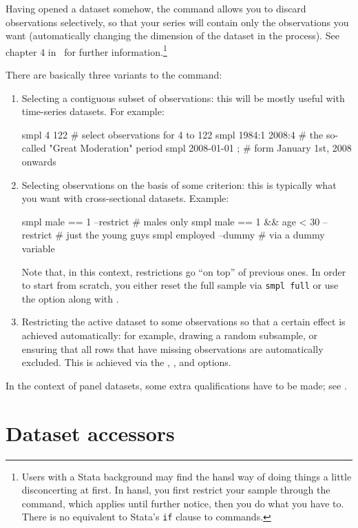 Having opened a dataset somehow, the  command allows you to
discard observations selectively, so that your series will contain
only the observations you want (automatically changing the dimension
of the dataset in the process). See chapter 4 in \GUG\ for further
information.\footnote{Users with a Stata background may find the hansl
  way of doing things a little disconcerting at first. In hansl, you
  first restrict your sample through the  command, which
  applies until further notice, then you do what you have to. There is
  no equivalent to Stata's \texttt{if} clause to commands.}

There are basically three variants to the  command:
\begin{enumerate}
\item Selecting a contiguous subset of observations: this will be
  mostly useful with time-series datasets. For example:
  \begin{code}
    smpl 4 122            # select observations for 4 to 122
    smpl 1984:1 2008:4    # the so-called "Great Moderation" period
    smpl 2008-01-01 ;     # form January 1st, 2008 onwards
  \end{code}
\item Selecting observations on the basis of some criterion: this is
  typically what you want with cross-sectional datasets. Example:
  \begin{code}
    smpl male == 1 --restrict                # males only
    smpl male == 1 && age < 30 --restrict    # just the young guys
    smpl employed --dummy                    # via a dummy variable
  \end{code}
  Note that, in this context, restrictions go ``on top'' of previous
  ones. In order to start from scratch, you either reset the full
  sample via \texttt{smpl full} or use the  option
  along with .
\item Restricting the active dataset to some observations so that a
  certain effect is achieved automatically: for example, drawing a
  random subsample, or ensuring that all rows that have missing
  observations are automatically excluded. This is achieved via the
  , , and 
  options.
\end{enumerate}

In the context of panel datasets, some extra qualifications have to be
made; see \GUG.

\section{Dataset accessors}
\label{sec:accessors}

